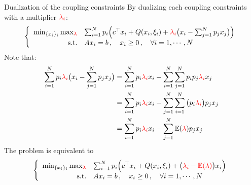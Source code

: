 \begin{frame}{Dualization of the coupling constraints}
  By dualizing each coupling constraints with a multiplier ${\color{red}\lambda_i}$:
  \begin{equation*}
    \left\{ \begin{array}{rll} \min_{\{x_i\}_i} \max_{{\color{red}\lambda}} & \sum_{i=1}^N p_i \Big(c^\top x_i +
        Q(x_i,\xi_i)  + {\color{red}\lambda_i} \big(x_i - \sum_{j=1}^N p_j x_j \big)\Big) \\
  \mbox{s.t.} & Ax_i=b\,, \quad x_i\geq0\,,\quad \forall i =1,\cdots,N
  \end{array} \right.
  \end{equation*}
  Note that:
  \begin{equation*}
    \begin{aligned}
    \sum_{i=1}^N p_i {\color{red}\lambda_i} \big(x_i - \sum_{j=1}^N p_j x_j \big)
    &= \sum_{i=1}^N p_i {\color{red}\lambda_i} x_i - \sum_{i=1}^N \sum_{j=1}^N p_i p_j {\color{red}\lambda_i} x_j \\
    &= \sum_{i=1}^N p_i {\color{red}\lambda_i} x_i - \sum_{j=1}^N \sum_{i=1}^N \big( p_i {\color{red}\lambda_i} \big) p_j  x_j \\
    &= \sum_{i=1}^N p_i {\color{red}\lambda_i} x_i - \sum_{j=1}^N \mathbb{E}({\color{red}\lambda}) p_j  x_j \\
    \end{aligned}
  \end{equation*}
  The problem is equivalent to
  \begin{equation*}
    \left\{ \begin{array}{rll} \min_{\{x_i\}_i} \max_{{\color{red}\lambda}} & \sum_{i=1}^N p_i \Big(c^\top x_i +
          Q(x_i,\xi_i)  + \big({\color{red}\lambda_i} - {\color{red}\mathbb{E}(\lambda)}\big) x_i \Big) \\
  \mbox{s.t.} & Ax_i=b\,, \quad x_i\geq0\,,\quad \forall i =1,\cdots,N
  \end{array} \right.
  \end{equation*}

\end{frame}


